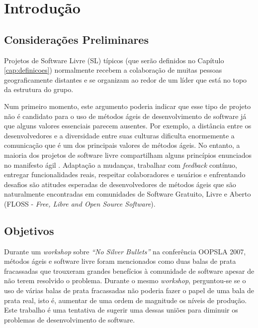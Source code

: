 \chapter{Introdução}
\label{cap:introducao}

\section{Considerações Preliminares}
\label{sec:consideracoes_preliminares}

Projetos de Software Livre (SL) típicos (que serão definidos no
Capítulo \ref{cap:definicoes}) normalmente recebem a colaboração de
muitas pessoas geograficamente distantes \cite{Dempsey1999} e se
organizam ao redor de um líder que está no topo da estrutura do grupo.

Num primeiro momento, este argumento poderia indicar que esse tipo de
projeto não é candidato para o uso de métodos ágeis de desenvolvimento
de software já que alguns valores essenciais parecem ausentes. Por
exemplo, a distância entre os desenvolvedores e a diversidade entre
suas culturas dificulta enormemente a comunicação que é um dos
principais valores de métodos ágeis. No entanto, a maioria dos projetos
de software livre compartilham alguns princípios enunciados no
manifesto ágil \cite{AgileManifesto}. Adaptação a mudanças, trabalhar
com \emph{feedback} contínuo, %
entregar funcionalidades reais, respeitar colaboradores e usuários e
enfrentando desafios são atitudes esperadas de desenvolvedores de
métodos ágeis que são naturalmente encontradas em comunidades de
Software Gratuito, Livre e Aberto (FLOSS - \emph{Free, Libre and Open
  Source Software}). %


\section{Objetivos}
\label{sec:objetivo}

Durante um \emph{workshop} \cite{OOPSLA07} sobre \emph{``No Silver
  Bullets''} \cite{Brooks1987} na conferência OOPSLA 2007, métodos
ágeis e software livre foram mencionados como duas balas de prata
fracassadas que trouxeram grandes benefícios à comunidade de software
apesar de não terem resolvido o problema. Durante o mesmo
\emph{workshop}, perguntou-se se o uso de várias balas de prata
fracassadas não poderia fazer o papel de uma bala de prata real, isto
é, aumentar de uma ordem de magnitude os níveis de produção. Este
trabalho é uma tentativa de sugerir uma dessas uniões para diminuir os
problemas de desenvolvimento de software.

